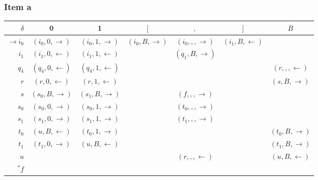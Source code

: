 \documentclass[docid=TP11]{tcom_TP}
\begin{document}
{\subsubsection{Item a}
\begin{center}
	\begin{tabular}{r | c c c c c c}
		$\delta$          & 0                     & 1                     & $[$                   & $,$                   & $]$                  & $B$ \\ \hline
		$\rightarrow i_0$ & $(i_0,0,\rightarrow)$ & $(i_0,1,\rightarrow)$ & $(i_0,B,\rightarrow)$ & $(i_0,,,\rightarrow)$ & $(i_1,B,\leftarrow)$ &     \\
		$            i_1$ & $(i_1,0,\leftarrow )$ & $(i_1,1,\leftarrow )$ &                       & $(q_1,B,\rightarrow)$ &                      &     \\
		$            q_4$ & $(q_4,0,\leftarrow )$ & $(q_4,1,\leftarrow )$ &                       &                       &                      & $(r  ,,,\leftarrow )$ \\
		$            r  $ & $(r  ,0,\leftarrow )$ & $(r  ,1,\leftarrow )$ &                       &                       &                      & $(s  ,B,\rightarrow)$ \\
		$            s  $ & $(s_0,B,\rightarrow)$ & $(s_1,B,\rightarrow)$ &                       & $(f  ,,,\rightarrow)$ &                      &     \\
		$            s_0$ & $(s_0,0,\rightarrow)$ & $(s_0,1,\rightarrow)$ &                       & $(t_0,,,\rightarrow)$ &                      &     \\
		$            s_1$ & $(s_1,0,\rightarrow)$ & $(s_1,1,\rightarrow)$ &                       & $(t_1,,,\rightarrow)$ &                      &     \\
		$            t_0$ & $(u  ,B,\leftarrow )$ & $(t_0,1,\rightarrow)$ &                       &                       &                      & $(t_0,B,\rightarrow)$ \\
		$            t_1$ & $(t_1,0,\rightarrow)$ & $(u  ,B,\leftarrow )$ &                       &                       &                      & $(t_1,B,\rightarrow)$ \\
		$            u  $ &                       &                       &                       & $(r  ,,,\leftarrow )$ &                      & $(u,B,\leftarrow)$ \\
		$         ^* f  $ &                       &                       &                       &                       &                      &

\end{tabular}
\end{center}}
\end{document}
